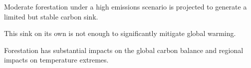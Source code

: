 \documentclass[draft]{agujournal2019}
\begin{document}








\begin{keypoints}
\item Moderate forestation under a high emissions scenario is projected to generate a limited but stable carbon sink.
\item This sink on its own is not enough to significantly mitigate global warming.
\item Forestation has substantial impacts on the global carbon balance and  regional impacts on temperature extremes.
\end{keypoints}

%
%

%
%
\end{document}
